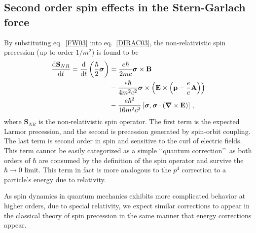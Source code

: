 \subsection{Second order spin effects in the Stern-Garlach force}
\label{sec:spinspin}
By substituting eq.~\eqref{FW03} into eq.~\eqref{DIRAC03}, the non-relativistic spin precession (up to order $1/m^{2}$) is found to be
\begin{alignat}{1}
  \notag\frac{\mathrm{d}\mathbf{S}_{NR}}{\mathrm{d}t}=\frac{\mathrm{d}}{\mathrm{d}t}\left(\frac{\hbar}{2}\boldsymbol{\sigma}\right)&=\frac{e\hbar}{2mc}\boldsymbol{\sigma}\times\mathbf{B}\\
  \notag&-\frac{e\hbar}{4m^{2}c^{2}}\boldsymbol{\sigma}\times\left(\mathbf{E}\times\left(\mathbf{p}-\frac{e}{c}\mathbf{A}\right)\right)\\
  \label{SPIN01}&-\frac{e\hbar^{2}}{16m^{2}c^{2}}\left[\boldsymbol{\sigma},\boldsymbol{\sigma}\cdot\left(\boldsymbol{\nabla}\times\mathbf{E}\right)\right]\,,
\end{alignat}
where $\mathbf{S}_{NR}$ is the non-relativistic spin operator. The first term is the expected Larmor precession, and the second is precession generated by spin-orbit coupling. The last term is second order in spin and sensitive to the curl of electric fields. This term cannot be easily categorized as a simple \lq\lq quantum correction\rq\rq\, as both orders of $\hbar$ are consumed by the definition of the spin operator and survive the $\hbar\rightarrow 0$ limit. This term in fact is more analogous to the $p^{4}$ correction to a particle's energy due to relativity.

As spin dynamics in quantum mechanics exhibits more complicated behavior at higher orders, due to special relativity, we expect similar corrections to appear in the classical theory of spin precession in the same manner that energy corrections appear.